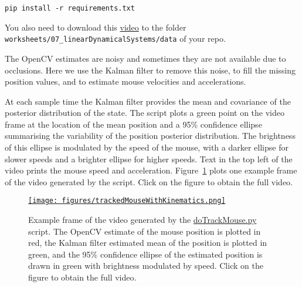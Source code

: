 \documentclass[12pt]{article}
\begin{document}
\noindent\texttt{pip install -r requirements.txt}

You also need to download this
\href{https://www.gatsby.ucl.ac.uk/~rapela/neuroinformatics/2024/worksheets/linearDynamicalSystems/videos/raw/FrameTop_2021-06-03T17-00-00_end001000.avi}{video}
to the folder \texttt{worksheets/07\_linearDynamicalSystems/data} of your repo.

The OpenCV estimates are noisy and sometimes they are not available due to occlusions.
Here we use the Kalman filter to remove this noise, to fill the
missing position values, and to estimate mouse velocities and accelerations.

At each sample time the Kalman filter provides the mean and covariance of the
posterior distribution of the state. The script plots a green point on the
video frame at the location of the mean position and a 95\% confidence ellipse
summarising the variability of the position posterior distribution. The
brightness of this ellipse is modulated by the speed of the mouse, with a
darker ellipse for slower speeds and a brighter ellipse for higher speeds. Text
in the top left of the video prints the mouse speed and acceleration.
Figure~\ref{fig:trackedMouseWithKinematics} plots one example frame of the
video generated by the script. Click on the figure to obtain the full video.

\begin{figure}
	\begin{center}
		\href{https://www.gatsby.ucl.ac.uk/~rapela/neuroinformatics/2024/worksheets/linearDynamicalSystems/videos/FrameTop_2021-06-03T17-00-00_end001000.avi}{\texttt{[image: figures/trackedMouseWithKinematics.png]}}
		\label{fig:trackedMouseWithKinematics}

        \caption{Example frame of the video generated by the
        \href{https://github.com/joacorapela/neuroinformatics24/blob/master/worksheets/07_linearDynamicalSystems/code/scripts/doTrackMouse.py}{doTrackMouse.py}
        script. The OpenCV estimate of the mouse position is plotted in red,
        the Kalman filter estimated mean of the position is plotted in green,
        and the 95\% confidence ellipse of the estimated position is drawn in
        green with brightness modulated by speed. Click on the figure to obtain
        the full video.}

	\end{center}
\end{figure}
\end{document}
